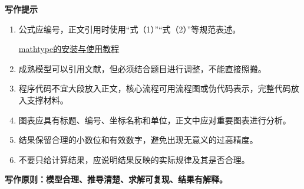 \textbf{写作提示}
\begin{enumerate}[label=(\arabic*), leftmargin=2.5em, itemsep=0.3em]
\item 公式应编号，正文引用时使用“式（1）”“式（2）”等规范表述。

\href{https://www.bilibili.com/video/BV1LpN2zQEo1?spm_id_from=333.788.videopod.sections&vd_source=b669ebd8251242404e23b3f8835d481e}{mathtype的安装与使用教程}

\item 成熟模型可以引用文献，但必须结合题目进行调整，不能直接照搬。

\item 程序代码不宜大段放入正文，核心流程可用流程图或伪代码表示，完整代码放入支撑材料。

\item 图表应具有标题、编号、坐标名称和单位，正文中应对重要图表进行分析。

\item 结果保留合理的小数位和有效数字，避免出现无意义的过高精度。

\item 不要只给计算结果，应说明结果反映的实际规律及其是否合理。
\end{enumerate}

\textbf{写作原则：模型合理、推导清楚、求解可复现、结果有解释。}
